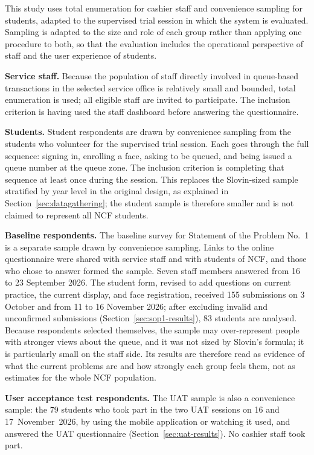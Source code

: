 \documentclass{research}
\begin{document}
This study uses total enumeration for cashier staff and convenience
sampling for students, adapted to the supervised trial session in which
the system is evaluated. Sampling is adapted to the size and role of
each group rather than applying one procedure to both, so that the
evaluation includes the operational perspective of staff and the user
experience of students.

\textbf{Service staff.} Because the population of staff directly
involved in queue-based transactions in the selected service office is
relatively small and bounded, total enumeration is used; all eligible
staff are invited to participate. The inclusion criterion is
having used the staff dashboard before answering the questionnaire.

\textbf{Students.} Student respondents are drawn by convenience
sampling from the students who volunteer for the supervised trial
session. Each goes through the full sequence: signing in, enrolling a
face, asking to be queued, and being issued a queue number at the queue
zone. The inclusion criterion is completing that sequence at least once
during the session. This replaces the Slovin-sized sample stratified by
year level in the original design, as explained in
Section~\ref{sec:datagathering}; the student sample is therefore smaller
and is not claimed to represent all NCF students.

\textbf{Baseline respondents.} The baseline survey for Statement of the
Problem No.~1 is a separate sample drawn by convenience sampling. Links
to the online questionnaire were shared with service staff and with
students of NCF, and those who chose to answer formed the sample. Seven
staff members answered from 16 to 23 September 2026. The student form,
revised to add questions on current practice, the current display, and
face registration, received 155 submissions on 3 October and from 11 to
16 November 2026; after excluding invalid and unconfirmed submissions
(Section~\ref{sec:sop1-results}), 83 students are analysed. Because
respondents selected themselves, the sample may over-represent people
with stronger views about the queue, and it was not sized by Slovin's
formula; it is particularly small on the staff side. Its results are therefore
read as evidence of what the current problems are and how strongly each
group feels them, not as estimates for the whole NCF population.

\textbf{User acceptance test respondents.} The UAT sample is also a
convenience sample: the 79 students who took part in the two UAT
sessions on 16 and 17~November~2026, by using the mobile application or
watching it used, and answered the UAT questionnaire
(Section~\ref{sec:uat-results}). No cashier staff took part.
\end{document}
